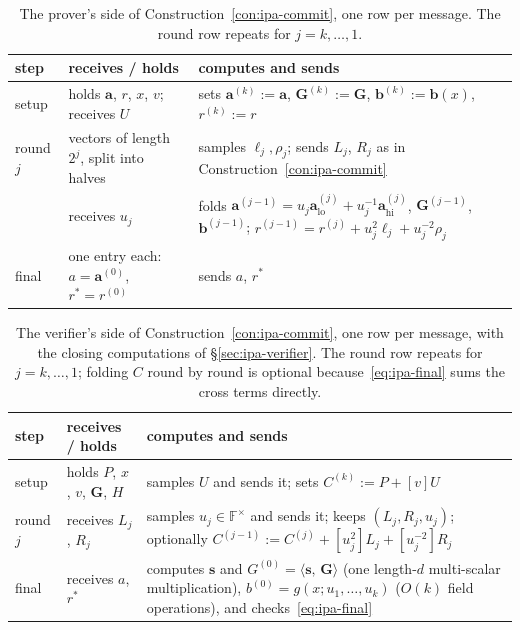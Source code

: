 \documentclass[11pt,a4paper]{article}
\theoremstyle{definition}
\newcommand{\F}{\mathbb{F}}
\newcommand{\ip}[2]{\langle #1,\, #2 \rangle}
\begin{document}
\begin{table}[htbp]
\centering
\small
\begin{tabular}{l p{5.6cm} p{5.9cm}}
\toprule
step & receives / holds & computes and sends \\
\midrule
setup
 & holds $\mathbf a$, $r$, $x$, $v$; receives $U$
 & sets $\mathbf a^{(k)} := \mathbf a$, $\mathbf G^{(k)} := \mathbf G$,
   $\mathbf b^{(k)} := \mathbf b(x)$, $r^{(k)} := r$ \\
\addlinespace
round $j$
 & vectors of length $2^{j}$, split into halves
 & samples $\ell_j, \rho_j$; sends $L_j$, $R_j$ as in
   Construction~\ref{con:ipa-commit} \\
 & receives $u_j$
 & folds $\mathbf a^{(j-1)} = u_j \mathbf a^{(j)}_{\mathrm{lo}}
   + u_j^{-1}\mathbf a^{(j)}_{\mathrm{hi}}$,
   $\mathbf G^{(j-1)}$, $\mathbf b^{(j-1)}$;
   $r^{(j-1)} = r^{(j)} + u_j^{2}\ell_j + u_j^{-2}\rho_j$ \\
\addlinespace
final
 & one entry each: $a = \mathbf a^{(0)}$, $r^{*} = r^{(0)}$
 & sends $a$, $r^{*}$ \\
\bottomrule
\end{tabular}
\caption{The prover's side of Construction~\ref{con:ipa-commit}, one row
per message. The round row repeats for $j = k, \dots, 1$.}
\label{tab:ipa-prover}
\end{table}

\begin{table}[htbp]
\centering
\small
\begin{tabular}{l p{5.6cm} p{5.9cm}}
\toprule
step & receives / holds & computes and sends \\
\midrule
setup
 & holds $P$, $x$, $v$, $\mathbf G$, $H$
 & samples $U$ and sends it; sets $C^{(k)} := P + [v]U$ \\
\addlinespace
round $j$
 & receives $L_j$, $R_j$
 & samples $u_j \in \F^{\times}$ and sends it; keeps
   $(L_j, R_j, u_j)$; optionally
   $C^{(j-1)} := C^{(j)} + [u_j^{2}]L_j + [u_j^{-2}]R_j$ \\
\addlinespace
final
 & receives $a$, $r^{*}$
 & computes $\mathbf s$ and $G^{(0)} = \ip{\mathbf s}{\mathbf G}$
   (one length-$d$ multi-scalar multiplication),
   $b^{(0)} = g(x; u_1, \dots, u_k)$ ($O(k)$ field operations),
   and checks~\eqref{eq:ipa-final} \\
\bottomrule
\end{tabular}
\caption{The verifier's side of Construction~\ref{con:ipa-commit}, one
row per message, with the closing computations of
\S\ref{sec:ipa-verifier}. The round row repeats for $j = k, \dots, 1$;
folding $C$ round by round is optional because~\eqref{eq:ipa-final}
sums the cross terms directly.}
\label{tab:ipa-verifier}
\end{table}
\end{document}

